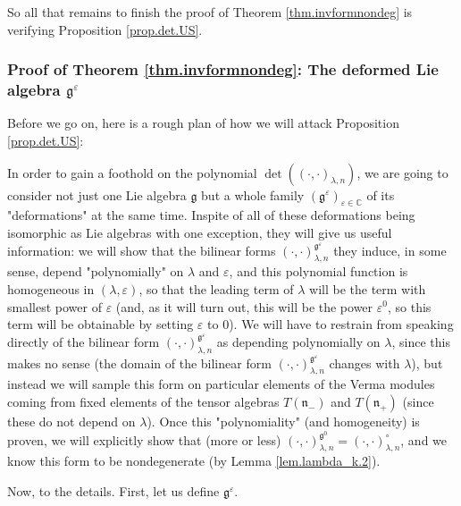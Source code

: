 \documentclass
[numbers=enddot,12pt,final,onecolumn,german,notitlepage]{scrartcl}%
\theoremstyle{definition}
\begin{document}
So all that remains to finish the proof of Theorem \ref{thm.invformnondeg} is
verifying Proposition \ref{prop.det.US}.

\subsubsection{Proof of Theorem \ref{thm.invformnondeg}: The deformed Lie
algebra $\mathfrak{g}^{\varepsilon}$}

Before we go on, here is a rough plan of how we will attack Proposition
\ref{prop.det.US}:

In order to gain a foothold on the polynomial $\det\left(  \left(  \cdot
,\cdot\right)  _{\lambda,n}\right)  $, we are going to consider not just one
Lie algebra $\mathfrak{g}$ but a whole family $\left(  \mathfrak{g}%
^{\varepsilon}\right)  _{\varepsilon\in\mathbb{C}}$ of its "deformations" at
the same time. Inspite of all of these deformations being isomorphic as Lie
algebras with one exception, they will give us useful information: we will
show that the bilinear forms $\left(  \cdot,\cdot\right)  _{\lambda
,n}^{\mathfrak{g}^{\varepsilon}}$ they induce, in some sense, depend
"polynomially" on $\lambda$ and $\varepsilon$, and this polynomial function is
homogeneous in $\left(  \lambda,\varepsilon\right)  $, so that the leading
term of $\lambda$ will be the term with smallest power of $\varepsilon$ (and,
as it will turn out, this will be the power $\varepsilon^{0}$, so this term
will be obtainable by setting $\varepsilon$ to $0$). We will have to restrain
from speaking directly of the bilinear form $\left(  \cdot,\cdot\right)
_{\lambda,n}^{\mathfrak{g}^{\varepsilon}}$ as depending polynomially on
$\lambda$, since this makes no sense (the domain of the bilinear form $\left(
\cdot,\cdot\right)  _{\lambda,n}^{\mathfrak{g}^{\varepsilon}}$ changes with
$\lambda$), but instead we will sample this form on particular elements of the
Verma modules coming from fixed elements of the tensor algebras $T\left(
\mathfrak{n}_{-}\right)  $ and $T\left(  \mathfrak{n}_{+}\right)  $ (since
these do not depend on $\lambda$). Once this "polynomiality" (and homogeneity)
is proven, we will explicitly show that (more or less) $\left(  \cdot
,\cdot\right)  _{\lambda,n}^{\mathfrak{g}^{0}}=\left(  \cdot,\cdot\right)
_{\lambda,n}^{\circ}$, and we know this form to be nondegenerate (by Lemma
\ref{lem.lambda_k.2}).

Now, to the details. First, let us define $\mathfrak{g}^{\varepsilon}$.
\end{document}

